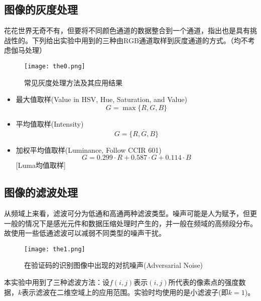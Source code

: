 \subsection{图像的灰度处理}

花花世界无奇不有，但要将不同颜色通道的数据整合到一个通道，指出也是具有挑战性的。下列给出实验中用到的三种由RGB通道取样到灰度通道的方式。（均不考虑伽马处理）

\begin{figure}[H]
    \centering
    \texttt{[image: the0.png]}
    \caption{常见灰度处理方法及其应用结果\cite{Kanan_2012}}
    \label{fig:the0}
\end{figure}

\begin{itemize}
    \item 最大值取样(Value in HSV, Hue, Saturation, and Value)
    \begin{equation}
        G = \max \{R, G, B\}
    \end{equation}
    \item 平均值取样(Intensity)
    \begin{equation}
        G = \overline{ \{R, G, B\} }
    \end{equation}
    \item 加权平均值取样(Luminance, Follow CCIR 601)
    \begin{equation}
        G = 0.299 \cdot R + 0.587 \cdot G + 0.114 \cdot B
    \end{equation}[Luma均值取样]
\end{itemize}

\subsection{图像的滤波处理}

从频域上来看，滤波可分为低通和高通两种滤波类型。噪声可能是人为赋予，但更一般的情况下是感光元件和数据压缩处理时产生的，并一般在频域的高频段分布。故使用一些低通滤波可以减弱不同类型的噪声干扰。

\begin{figure}[H]
    \centering
    \texttt{[image: the1.png]}
    \caption{在验证码的识别图像中出现的对抗噪声(Adversarial Noise)\cite{Lambda_2018}}
    \label{fig:the1}
\end{figure}

本实验中用到了三种滤波方法：设$f(i, j)$表示$(i, j)$所代表的像素点的强度数据，$k$表示滤波在二维空域上的应用范围。实验时均使用的是小滤波子(即$k=1$)。

